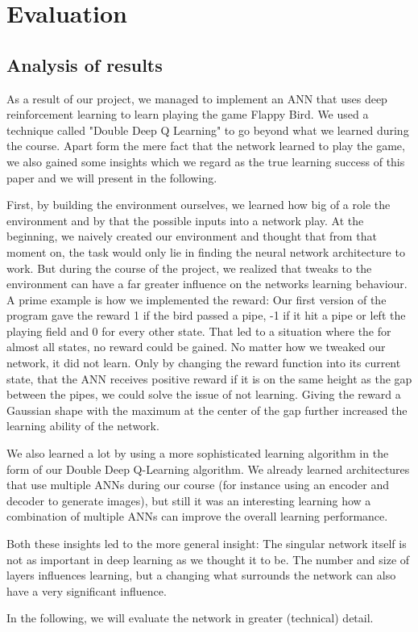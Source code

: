 \section{Evaluation}\label{sec:eval}

\subsection{Analysis of results}

As a result of our project, we managed to implement an ANN that uses deep reinforcement learning to learn playing the game Flappy Bird. We used a technique called "Double Deep Q Learning" to go beyond what we learned during the course. Apart form the mere fact that the network learned to play the game, we also gained some insights which we regard as the true learning success of this paper and we will present in the following.
\par
First, by building the environment ourselves, we learned how big of a role the environment and by that the possible inputs into a network play. At the beginning, we naively created our environment and thought that from that moment on, the task would only lie in finding the neural network architecture to work. But during the course of the project, we realized that tweaks to the environment can have a far greater influence on the networks learning behaviour. A prime example is how we implemented the reward: Our first version of the program gave the reward 1 if the bird passed a pipe, -1 if it hit a pipe or left the playing field and 0 for every other state. That led to a situation where the for almost all states, no reward could be gained. No matter how we tweaked our network, it did not learn. Only by changing the reward function into its current state, that the ANN receives positive reward if it is on the same height as the gap between the pipes, we could solve the issue of not learning. Giving the reward a Gaussian shape with the maximum at the center of the gap further increased the learning ability of the network.
\par
We also learned a lot by using a more sophisticated learning algorithm in the form of our Double Deep Q-Learning algorithm. We already learned architectures that use multiple ANNs during our course (for instance using an encoder and decoder to generate images), but still it was an interesting learning how a combination of multiple ANNs can improve the overall learning performance.
\par
Both these insights led to the more general insight: The singular network itself is not as important in deep learning as we thought it to be. The number and size of layers influences learning, but a changing what surrounds the network can also have a very significant influence. 
\par
In the following, we will evaluate the network in greater (technical) detail.


